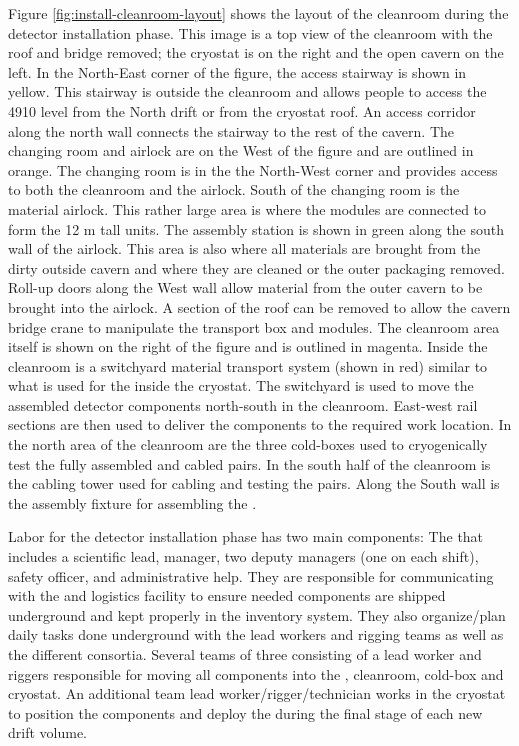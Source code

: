 Figure \ref{fig:install-cleanroom-layout} shows the layout of the cleanroom during the detector installation phase. This image is a top view of the cleanroom with the roof and bridge removed; the cryostat is on the right and the open cavern on the left. In the North-East corner of the figure, the access stairway is shown in yellow. This stairway is outside the cleanroom and allows people to access the 4910 level from the North drift or from the cryostat roof. An access corridor along the north  wall connects the stairway to the rest of the cavern. The changing room and airlock are on the West of the figure and are outlined in orange. The changing room is in the the North-West corner and provides access to both the cleanroom and the airlock. South of the changing room is the material airlock. This rather large area is where the  modules are connected to form the 12 \si{m} tall units. The assembly station is shown in green along the south wall of the airlock. This area is also where all materials are brought from the dirty outside cavern and where they are cleaned or the outer packaging removed. Roll-up doors along the West wall allow material from the outer cavern to be brought into the airlock. A section of the roof can be removed to allow the cavern bridge crane to manipulate the  transport box and modules. The cleanroom area itself is shown on the right of the figure and is outlined in magenta. Inside the cleanroom is a switchyard material transport system (shown in red) similar to what is used for the  inside the cryostat. The switchyard is used to move the assembled detector components north-south in the cleanroom. East-west rail sections are then used to deliver the components to the required work location. In the north area of the cleanroom are the three cold-boxes used to cryogenically test the fully assembled and cabled  pairs. In the south half of the cleanroom is the  cabling tower used for cabling and testing the  pairs. Along the South wall is the  assembly fixture for assembling the . 

Labor for the detector installation phase has two main components: 
The  that includes a scientific lead, manager, two deputy managers (one on each shift), safety officer, and administrative help. They are responsible for communicating with the  and logistics facility to ensure needed components are shipped underground and kept properly in the inventory system.  They also organize/plan daily tasks done underground with the lead workers and rigging teams as well as the different consortia.  Several teams of three  consisting of a lead worker and riggers responsible for moving all  components into the ,  cleanroom, cold-box and cryostat. An additional team lead worker/rigger/technician works in the cryostat to position the  components and deploy the  during the final stage of each new drift volume. 

